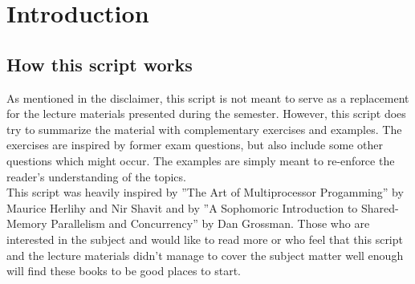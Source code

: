 \documentclass[main]{subfiles}
\begin{document}
\section{Introduction}
\subsection{How this script works}
As mentioned in the disclaimer, this script is not meant to serve as a replacement for the lecture materials presented during the semester. However, this script does try to summarize the material with complementary exercises and examples. The exercises are inspired by former exam questions, but also include some other questions which might occur. The examples are simply meant to re-enforce the reader's understanding of the topics.\\[3mm]
This script was heavily inspired by ''The Art of Multiprocessor Progamming'' by Maurice Herlihy and Nir Shavit and by ''A Sophomoric Introduction to Shared-Memory Parallelism and Concurrency'' by Dan Grossman. Those who are interested in the subject and would like to read more or who feel that this script and the lecture materials didn't manage to cover the subject matter well enough will find these books to be good places to start.
\end{document}
